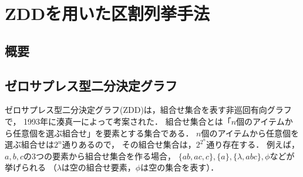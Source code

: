 \chapter{ZDDを用いた区割列挙手法} \label{chapter:3}

\section{概要}

\section{ゼロサプレス型二分決定グラフ}
ゼロサプレス型二分決定グラフ(ZDD)は，組合せ集合を表す非巡回有向グラフで，
1993年に湊真一によって考案された\cite{minato}．
組合せ集合とは「$n$個のアイテムから任意個を選ぶ組合せ」を要素とする集合である．
$n$個のアイテムから任意個を選ぶ組合せは$2^n$通りあるので，
その組合せ集合は，$2^{2^n}$通り存在する．
例えば，$a,b,c$の3つの要素から組合せ集合を作る場合，
$\{ab, ac, c\}, \{a\}, \{\lambda, abc\}, \phi$などが挙げられる
（$\lambda$は空の組合せ要素，$\phi$は空の集合を表す）．

